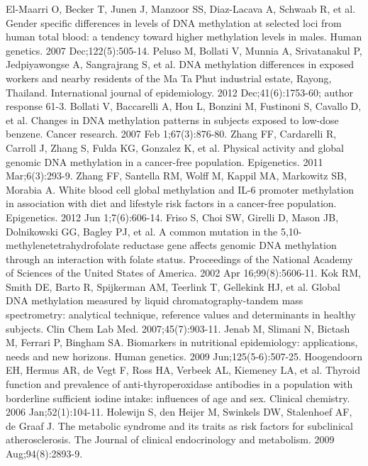 \begin{thebibliography}{12}
		El-Maarri O, Becker T, Junen J, Manzoor SS, Diaz-Lacava A, Schwaab R, et al. Gender specific differences in levels of DNA methylation at selected loci from human total blood: a tendency toward higher methylation levels in males. Human genetics. 2007 Dec;122(5):505-14. 
		Peluso M, Bollati V, Munnia A, Srivatanakul P, Jedpiyawongse A, Sangrajrang S, et al. DNA methylation differences in exposed workers and nearby residents of the Ma Ta Phut industrial estate, Rayong, Thailand. International journal of epidemiology. 2012 Dec;41(6):1753-60; author response 61-3. 
		Bollati V, Baccarelli A, Hou L, Bonzini M, Fustinoni S, Cavallo D, et al. Changes in DNA methylation patterns in subjects exposed to low-dose benzene. Cancer research. 2007 Feb 1;67(3):876-80. 
		Zhang FF, Cardarelli R, Carroll J, Zhang S, Fulda KG, Gonzalez K, et al. Physical activity and global genomic DNA methylation in a cancer-free population. Epigenetics. 2011 Mar;6(3):293-9. 
		Zhang FF, Santella RM, Wolff M, Kappil MA, Markowitz SB, Morabia A. White blood cell global methylation and IL-6 promoter methylation in association with diet and lifestyle risk factors in a cancer-free population. Epigenetics. 2012 Jun 1;7(6):606-14. 
		Friso S, Choi SW, Girelli D, Mason JB, Dolnikowski GG, Bagley PJ, et al. A common mutation in the 5,10-methylenetetrahydrofolate reductase gene affects genomic DNA methylation through an interaction with folate status. Proceedings of the National Academy of Sciences of the United States of America. 2002 Apr 16;99(8):5606-11. 
		Kok RM, Smith DE, Barto R, Spijkerman AM, Teerlink T, Gellekink HJ, et al. Global DNA methylation measured by liquid chromatography-tandem mass spectrometry: analytical technique, reference values and determinants in healthy subjects. Clin Chem Lab Med. 2007;45(7):903-11. 
		Jenab M, Slimani N, Bictash M, Ferrari P, Bingham SA. Biomarkers in nutritional epidemiology: applications, needs and new horizons. Human genetics. 2009 Jun;125(5-6):507-25. 
		Hoogendoorn EH, Hermus AR, de Vegt F, Ross HA, Verbeek AL, Kiemeney LA, et al. Thyroid function and prevalence of anti-thyroperoxidase antibodies in a population with borderline sufficient iodine intake: influences of age and sex. Clinical chemistry. 2006 Jan;52(1):104-11. 
		Holewijn S, den Heijer M, Swinkels DW, Stalenhoef AF, de Graaf J. The metabolic syndrome and its traits as risk factors for subclinical atherosclerosis. The Journal of clinical endocrinology and metabolism. 2009 Aug;94(8):2893-9. 

\end{thebibliography}
